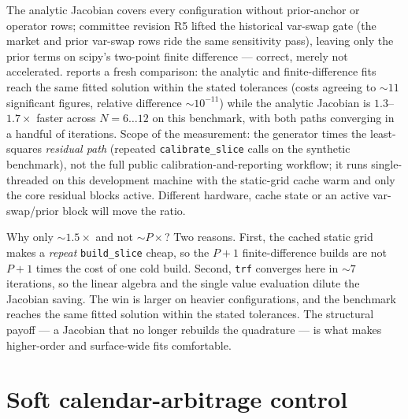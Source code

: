 \documentclass[11pt]{article}
\begin{document}
The analytic Jacobian covers every configuration without prior-anchor or
operator rows; committee revision R5 lifted the historical var-swap gate (the
market and prior var-swap rows ride the same sensitivity pass), leaving only
the prior terms on scipy's two-point finite difference --- correct, merely
not accelerated.  reports a fresh comparison:
the analytic and finite-difference fits reach the same fitted solution within
the stated tolerances (costs agreeing to $\sim11$ significant figures,
relative difference $\sim10^{-11}$) while the analytic Jacobian is
$1.3$--$1.7\times$ faster across $N=6\ldots12$ on this benchmark, with both
paths converging in a handful of iterations. Scope of the measurement: the
generator times the least-squares \emph{residual path} (repeated
\texttt{calibrate\_slice} calls on the synthetic benchmark), not the full
public calibration-and-reporting workflow; it runs single-threaded on this
development machine with the static-grid cache warm and only the core residual
blocks active. Different hardware, cache state or an active var-swap/prior
block will move the ratio.

\begin{table}[H]
\centering
\caption{Analytic vs.\ two-point finite-difference Jacobian, fresh run of the
production calibrator on the SVI-JW benchmark (fastest of three repeats,
single-threaded, warm static-grid cache, core residual blocks only). $P=N+1$
is the parameter count; the cost column confirms the same optimum within
tolerance.}
\label{tab:timing}
\lqdtimingtable
\end{table}

\begin{heuristic}
Why only $\sim1.5\times$ and not $\sim P\times$? Two reasons. First, the cached
static grid makes a \emph{repeat} \texttt{build\_slice} cheap, so the $P+1$
finite-difference builds are not $P+1$ times the cost of one cold build. Second,
\texttt{trf} converges here in $\sim7$ iterations, so the linear algebra and the
single value evaluation dilute the Jacobian saving. The win is larger on heavier
configurations, and the benchmark reaches the same fitted solution within the
stated tolerances. The structural payoff --- a Jacobian that no longer rebuilds
the quadrature --- is what makes higher-order and surface-wide fits comfortable.
\end{heuristic}

\section{Soft calendar-arbitrage control}
\label{sec:calendar}
\end{document}
